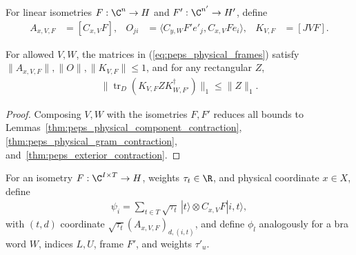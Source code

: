 \begin{definition}
    \label{def:peps_physical_frames}
    \leanok
    For linear isometries $F:\C^n\to H$ and $F':\C^{n'}\to H'$, define
    \begin{align}
        A_{x,V,F} & =[C_{x,V}F],                               &
        O_{ji}    & =\langle C_{y,W}F'e'_j,C_{x,V}Fe_i\rangle, &
        K_{V,F}   & =[JVF].
        \label{eq:peps_physical_frames}
    \end{align}
\end{definition}

\begin{lemma}
    \label{thm:peps_physical_frame_contraction}
    \leanok
    For allowed $V,W$, the matrices in (\ref{eq:peps_physical_frames}) satisfy
    $\|A_{x,V,F}\|,\|O\|,\|K_{V,F}\|\le 1$, and for any rectangular $Z$,
    \begin{align}
        \|\operatorname{tr}_{D}(K_{V,F}ZK_{W,F'}^\dagger)\|_1\leq\|Z\|_1.
        \label{eq:peps_physical_frame_contraction}
    \end{align}
\end{lemma}

\begin{proof}\leanok
    Composing $V,W$ with the isometries $F,F'$ reduces all bounds to
    Lemmas~\ref{thm:peps_physical_component_contraction},
    \ref{thm:peps_physical_gram_contraction}, and~\ref{thm:peps_exterior_contraction}.
\end{proof}

\begin{definition}
    \label{def:peps_schmidt_physical_vector}
    \leanok
    For an isometry $F:\C^{I\times T}\to H$, weights $\tau_t\in\R$, and physical
    coordinate $x\in X$, define
    \begin{align}
        \psi_i=\sum_{t\in T}\sqrt{\tau_t}\,|t\rangle\otimes C_{x,V}F|i,t\rangle,
        \label{eq:peps_schmidt_physical_vector}
    \end{align}
    with $(t,d)$ coordinate $\sqrt{\tau_t}(A_{x,V,F})_{d,(i,t)}$, and define
    $\phi_l$ analogously for a bra word $W$, indices $L,U$, frame $F'$, and
    weights $\tau'_u$.
\end{definition}

